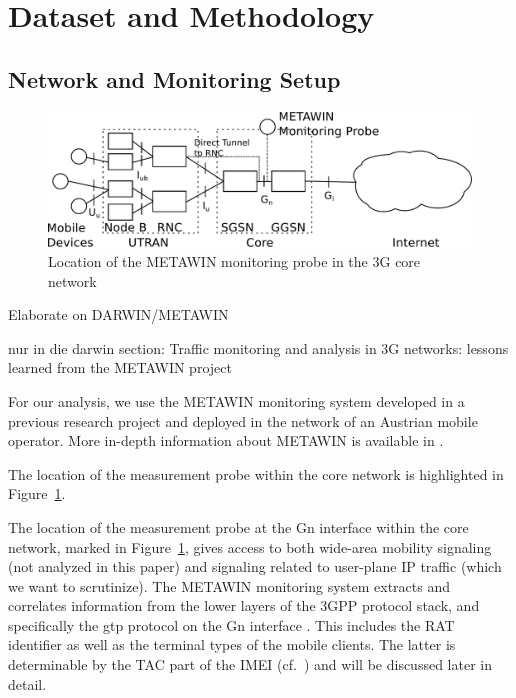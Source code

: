 \section{Dataset and Methodology}
\label{c4:methodology}



\subsection{Network and Monitoring Setup}



\begin{figure}[htb]
	\centering
	\includegraphics[width=1.0\textwidth]{images/umts-network.pdf}
	\caption{Location of the \acrshort{METAWIN} monitoring probe in the \gls{3G} core network}
	\label{c4:fig:umtsnetwork}
\end{figure}



Elaborate on DARWIN/METAWIN

	 nur in die darwin section: Traffic monitoring and analysis in 3G networks: lessons learned from the METAWIN project \cite{ricciato2006traffic}


For our analysis, we use the \gls{METAWIN} monitoring system developed in a previous research project and deployed in the network of an Austrian mobile operator.  More in-depth information about \gls{METAWIN} is available in \cite{ricciato_2011}.

The location of the measurement probe within the core network is highlighted in Figure~\ref{c4:fig:umtsnetwork}. 

 The location of the measurement probe at the Gn interface within the core network, marked in Figure~\ref{c4:fig:umtsnetwork}, gives access to both wide-area mobility signaling (not analyzed in this paper) and signaling related to user-plane IP traffic (which we want to scrutinize). The \gls{METAWIN} monitoring system extracts and correlates information from the lower layers of the \gls{3GPP} protocol stack, and specifically the \gls{gtp} protocol on the Gn interface \cite{3gpp.29.060}. This includes the \acrfull{RAT} identifier as well as the terminal types of the mobile clients. The latter is determinable by the \acrfull{TAC} part of the \acrfull{IMEI} (cf.~\cite{3gpp.23.003}) and will be discussed later in detail.

